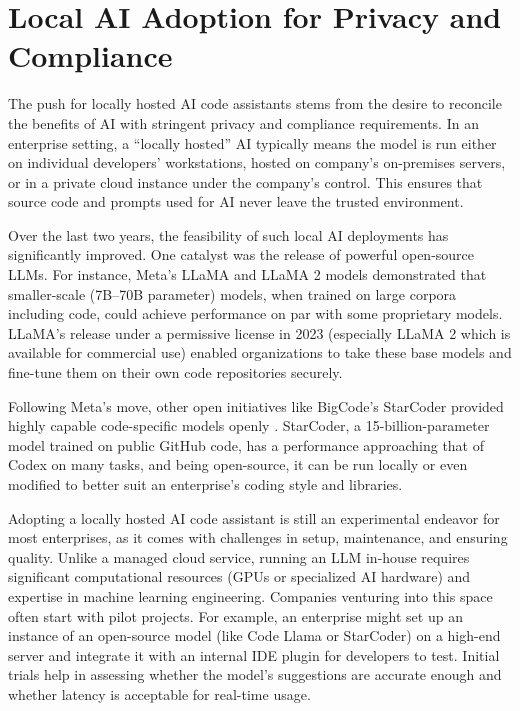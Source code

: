 \section{Local AI Adoption for Privacy and Compliance}
\label{sec:local-ai-for-privacy}
The push for locally hosted \gls{AI} code assistants stems from the desire to reconcile the benefits of \gls{AI} with stringent privacy and compliance requirements. In an enterprise setting, a “locally hosted” \gls{AI} typically means the model is run either on individual developers’ workstations, hosted on  company’s on-premises servers, or in a private cloud instance under the company’s control. This ensures that source code and prompts used for \gls{AI} never leave the trusted environment.

Over the last two years, the feasibility of such local \gls{AI} deployments has significantly improved. One catalyst was the release of powerful open-source LLMs. For instance, Meta’s LLaMA and LLaMA 2 models \autocite{Touvron2023} demonstrated that smaller-scale (7B–70B parameter) models, when trained on large corpora including code, could achieve performance on par with some proprietary models. LLaMA’s release under a permissive license in 2023 (especially LLaMA 2 which is available for commercial use) enabled organizations to take these base models and fine-tune them on their own code repositories securely.

Following Meta’s move, other open initiatives like BigCode’s StarCoder provided highly capable code-specific models openly \autocite{Li2023StarCoder}. StarCoder, a 15-billion-parameter model trained on public GitHub code, has a performance approaching that of Codex on many tasks, and being open-source, it can be run locally or even modified to better suit an enterprise’s coding style and libraries.

Adopting a locally hosted \gls{AI} code assistant is still an experimental endeavor for most enterprises, as it comes with challenges in setup, maintenance, and ensuring quality. Unlike a managed cloud service, running an \gls{LLM} in-house requires significant computational resources (GPUs or specialized \gls{AI} hardware) and expertise in machine learning engineering. Companies venturing into this space often start with pilot projects. For example, an enterprise might set up an instance of an open-source model (like Code Llama or StarCoder) on a high-end server and integrate it with an internal \gls{IDE} plugin for developers to test. Initial trials help in assessing whether the model’s suggestions are accurate enough and whether latency is acceptable for real-time usage.

